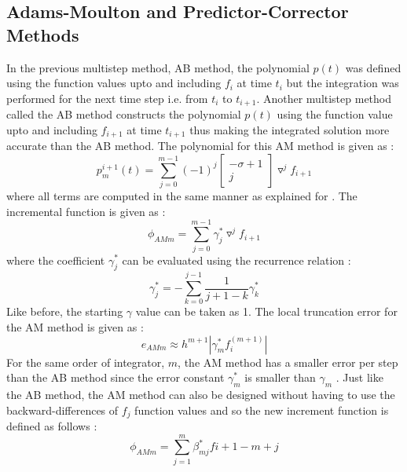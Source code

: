 \subsection{Adams-Moulton and Predictor-Corrector Methods}
In the previous multistep method, \gls{AB} method, the polynomial $p(t)$ was defined using the function values upto and including $f_i$ at time $t_i$ but the integration was performed for the next time step i.e. from $t_i$ to $t_{i+1}$. Another multistep method called the \gls{AB} method constructs the polynomial $p(t)$ using the function value upto and including $f_{i+1}$ at time $t_{i+1}$ thus making the integrated solution more accurate than the \gls{AB} method. The polynomial for this \gls{AM} method is given as \cite{gillbook}:
\begin{equation}
\label{poly_am}
p_m^{i+1}(t) = \sum_{j=0}^{m-1} (-1)^j
\begin{bmatrix}
-\sigma+1 \\
j
\end{bmatrix}
\triangledown^j f_{i+1}
\end{equation}
%
where all terms are computed in the same manner as explained for . The incremental function is given as \cite{gillbook}:
\begin{equation}
\label{phi_am}
\phi_{AMm} = \sum_{j=0}^{m-1} \gamma_j^* \triangledown^j f_{i+1}
\end{equation}
%
where the coefficient $\gamma_j^*$ can be evaluated using the recurrence relation \cite{gillbook}:
\begin{equation}
\label{gamma_am}
\gamma_j^* = -\sum_{k=0}^{j-1} \frac{1}{j+1-k} \gamma_k^*
\end{equation}
%
Like before, the starting $\gamma$ value can be taken as 1. The local truncation error for the \gls{AM} method is given as \cite{gillbook}:
\begin{equation}
e_{AMm} \approx h^{m+1} |\gamma_m^* f_i^{(m+1)}|
\end{equation}
%
For the same order of integrator, $m$, the \gls{AM} method has a smaller error per step than the \gls{AB} method since the error constant $\gamma_m^*$ is smaller than $\gamma_m$ \cite{gillbook}. Just like the \gls{AB} method, the \gls{AM} method can also be designed without having to use the backward-differences of $f_j$ function values and so the new increment function is defined as follows \cite{gillbook}:
\begin{equation}
\label{phi_am_2}
\phi_{AMm} = \sum_{j=1}^m \beta_{mj}^* f{i+1-m+j}
\end{equation}
